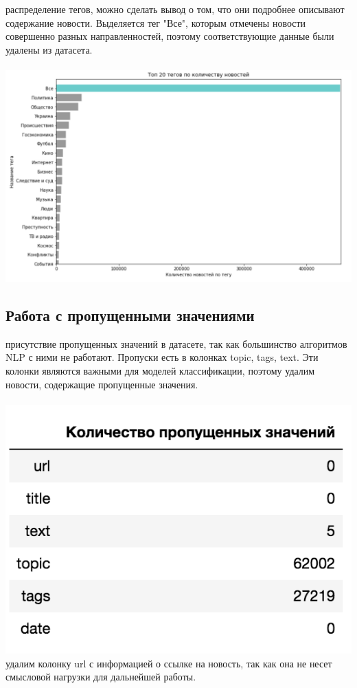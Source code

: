 \documentclass{article}
\newcommand\tab[1][1cm]{\hspace*{#1}}
\begin{document}
 распределение тегов, можно сделать вывод о том, что они подробнее описывают содержание новости. Выделяется тег "Все", которым отмечены новости совершенно разных направленностей, поэтому соответствующие данные были удалены из датасета.\\
\\
\includegraphics[scale=0.6]{f3.png}\\
\subsection{Работа с пропущенными значениями}
 присутствие пропущенных значений в датасете, так как большинство алгоритмов NLP с ними не работают. Пропуски есть в колонках topic, tags, text. Эти колонки являются важными для моделей классификации, поэтому удалим новости, содержащие пропущенные значения.\\\\
\tab\includegraphics[scale=0.8]{f4.png}\\
 удалим колонку url с информацией о ссылке на новость, так как она не несет смысловой нагрузки для дальнейшей работы.\\
\end{document}

